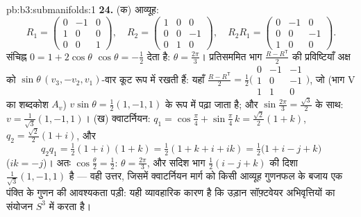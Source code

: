 \begin{solution}{pb:b3:submanifolds:1}
\textbf{24.} (क) आव्यूह:
\[
R_1 = \begin{pmatrix} 0 & -1 & 0\\ 1 & 0 & 0\\ 0 & 0 & 1
\end{pmatrix},
\quad
R_2 = \begin{pmatrix} 1 & 0 & 0\\ 0 & 0 & -1\\ 0 & 1 & 0
\end{pmatrix},
\quad
R_2R_1 = \begin{pmatrix} 0 & -1 & 0\\ 0 & 0 & -1\\ 1 & 0 &
0\end{pmatrix}.
\]
संचिह्न $0 = 1 + 2\cos\theta$ $\cos\theta = -\frac12$ देता है: $\theta = \frac{2\pi}3$। प्रतिसममित भाग $\frac{R -
R^{\mathsf T}}2$ की प्रविष्टियाँ
अक्ष को $\sin\theta\,(v_3,
-v_2, v_1)$-वार कूट रूप में रखती हैं: यहाँ $\frac{R - R^{\mathsf T}}2 =
\frac12\bigl(\begin{smallmatrix}0 & -1 & -1\\ 1 & 0 & -1\\ 1
& 1 & 0\end{smallmatrix}\bigr)$, जो (भाग V का
शब्दकोश $A_v$) $v\sin\theta = \frac12(1, -1, 1)$ के रूप में पढ़ा जाता है; और $\sin\frac{2\pi}3 = \frac{\sqrt3}2$ के साथ: $v = \frac1{\sqrt3}(1,
-1, 1)$।
(ख) क्वाटर्नियन: $q_1 = \cos\frac\pi4 + \sin\frac\pi4\,k =
\frac{\sqrt2}2(1 + k)$, $q_2 = \frac{\sqrt2}2(1 + i)$, और
\[
q_2q_1 = \tfrac12(1 + i)(1 + k) = \tfrac12(1 + k + i + ik)
= \tfrac12\bigl(1 + i - j + k\bigr)
\]
($ik = -j$)। अतः $\cos\frac\theta2 = \frac12$: $\theta =
\frac{2\pi}3$, और सदिश भाग $\frac12(i - j + k)$ की दिशा $\frac1{\sqrt3}(1, -1, 1)$ है ---
वही उत्तर, जिसमें क्वाटर्नियन मार्ग को किसी आव्यूह गुणनफल के बजाय
एक पंक्ति के गुणन की आवश्यकता पड़ी: यही व्यावहारिक कारण है कि उड़ान
सॉफ़्टवेयर अभिवृत्तियों का संयोजन $S^3$ में करता है।


\end{solution}
